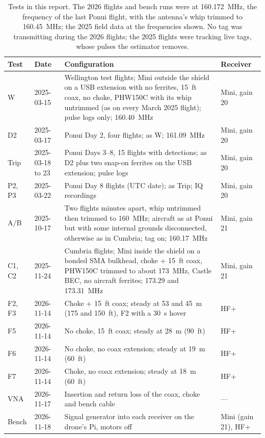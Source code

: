 \documentclass[11pt]{article}
\begin{document}
\begin{table}[!htbp]
\centering\small
\begin{tabularx}{\linewidth}{@{}l l X l@{}}
\toprule
Test & Date & Configuration & Receiver \\
\midrule
W & 2025-03-15 & Wellington test flights; Mini outside the shield on a USB extension with no ferrites, 15~ft coax, no choke, PHW150C with its whip untrimmed (as on every March 2025 flight); pulse logs only; 160.40~MHz & Mini, gain 20 \\
D2 & 2025-03-17 & Ponui Day 2, four flights; as W; 161.09~MHz & Mini, gain 20 \\
Trip & 2025-03-18 to 23 & Ponui Days 3--8, 15 flights with detections; as D2 plus two snap-on ferrites on the USB extension; pulse logs & Mini, gain 20 \\
P2, P3 & 2025-03-22 & Ponui Day 8 flights (UTC date); as Trip; IQ recordings & Mini, gain 20 \\
A/B & 2025-10-17 & Two flights minutes apart, whip untrimmed then trimmed to 160~MHz; aircraft as at Ponui but with some internal grounds disconnected, otherwise as in Cumbria; tag on; 160.17~MHz & Mini, gain 21 \\
C1, C2 & 2025-11-24 & Cumbria flights; Mini inside the shield on a bonded SMA bulkhead, choke + 15~ft coax, PHW150C trimmed to about 173~MHz, Castle BEC, no aircraft ferrites; 173.29 and 173.31~MHz & Mini, gain 21 \\
F2, F3 & 2026-11-14 & Choke + 15~ft coax; steady at 53 and 45~m (175 and 150~ft), F2 with a 30~s hover & HF+ \\
F5 & 2026-11-14 & No choke, 15~ft coax; steady at 28~m (90~ft) & HF+ \\
F6 & 2026-11-14 & No choke, no coax extension; steady at 19~m (60~ft) & HF+ \\
F7 & 2026-11-14 & Choke, no coax extension; steady at 18~m (60~ft) & HF+ \\
VNA & 2026-11-17 & Insertion and return loss of the coax, choke and bench cable & --- \\
Bench & 2026-11-18 & Signal generator into each receiver on the drone's Pi, motors off & Mini (gain 21), HF+ \\
\bottomrule
\end{tabularx}
\caption{Tests in this report. The 2026 flights and bench runs were at 160.172~MHz, the frequency of
the last Ponui flight, with the antenna's whip trimmed to 160.45~MHz; the 2025 field data at the frequencies shown. No tag was transmitting during
the 2026 flights; the 2025 flights were tracking live tags, whose pulses the estimator removes.}
\label{tab:tests}
\end{table}
\end{document}

